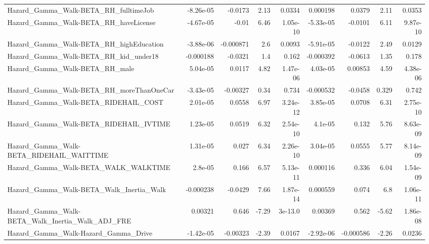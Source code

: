 \begin{tabular}{lrrrrrrrr}
Hazard\_Gamma\_Walk-BETA\_RH\_fulltimeJob              &   -8.26e-05 &      -0.0173 &     2.13 &   0.0334 &   0.000198 &      0.0379 &         2.11 &        0.0353 \\
Hazard\_Gamma\_Walk-BETA\_RH\_haveLicense              &   -4.67e-05 &        -0.01 &     6.46 & 1.05e-10 &  -5.33e-05 &     -0.0101 &         6.11 &      9.87e-10 \\
Hazard\_Gamma\_Walk-BETA\_RH\_highEducation            &   -3.88e-06 &    -0.000871 &      2.6 &   0.0093 &  -5.91e-05 &     -0.0122 &         2.49 &        0.0129 \\
Hazard\_Gamma\_Walk-BETA\_RH\_kid\_under18              &   -0.000188 &      -0.0321 &      1.4 &    0.162 &  -0.000392 &     -0.0613 &         1.35 &         0.178 \\
Hazard\_Gamma\_Walk-BETA\_RH\_male                     &    5.04e-05 &       0.0117 &     4.82 & 1.47e-06 &   4.03e-05 &     0.00853 &         4.59 &      4.38e-06 \\
Hazard\_Gamma\_Walk-BETA\_RH\_moreThanOneCar           &   -3.43e-05 &     -0.00327 &     0.34 &    0.734 &  -0.000532 &     -0.0458 &        0.329 &         0.742 \\
Hazard\_Gamma\_Walk-BETA\_RIDEHAIL\_COST               &    2.01e-05 &       0.0558 &     6.97 & 3.24e-12 &   3.85e-05 &      0.0708 &         6.31 &      2.75e-10 \\
Hazard\_Gamma\_Walk-BETA\_RIDEHAIL\_IVTIME             &    1.23e-05 &       0.0519 &     6.32 & 2.54e-10 &    4.1e-05 &       0.132 &         5.76 &      8.63e-09 \\
Hazard\_Gamma\_Walk-BETA\_RIDEHAIL\_WAITTIME           &    1.31e-05 &        0.027 &     6.34 & 2.26e-10 &   3.04e-05 &      0.0555 &         5.77 &      8.14e-09 \\
Hazard\_Gamma\_Walk-BETA\_WALK\_WALKTIME               &     2.8e-05 &        0.166 &     6.57 & 5.13e-11 &   0.000116 &       0.336 &         6.04 &      1.54e-09 \\
Hazard\_Gamma\_Walk-BETA\_Walk\_Inertia\_Walk           &   -0.000238 &      -0.0429 &     7.66 & 1.87e-14 &   0.000559 &       0.074 &          6.8 &      1.06e-11 \\
Hazard\_Gamma\_Walk-BETA\_Walk\_Inertia\_Walk\_ADJ\_FRE   &     0.00321 &        0.646 &    -7.29 &  3e-13.0 &    0.00369 &       0.562 &        -5.62 &      1.86e-08 \\
Hazard\_Gamma\_Walk-Hazard\_Gamma\_Drive               &   -1.42e-05 &     -0.00323 &    -2.39 &   0.0167 &  -2.92e-06 &   -0.000586 &        -2.26 &        0.0236 \\

\end{tabular}

